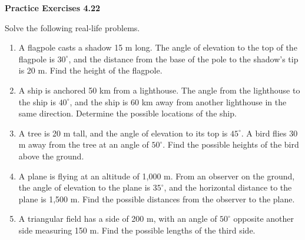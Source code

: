 \vspace{0.3ex}
\noindent\textbf{Practice Exercises 4.22}

\vspace{0.2ex}

Solve the following real-life problems.

\begin{enumerate}
    \item A flagpole casts a shadow 15 m long. The angle of elevation to the top of the flagpole is \(30^\circ\), and the distance from the base of the pole to the shadow's tip is 20 m. Find the height of the flagpole.
    \item A ship is anchored 50 km from a lighthouse. The angle from the lighthouse to the ship is \(40^\circ\), and the ship is 60 km away from another lighthouse in the same direction. Determine the possible locations of the ship.
    \item A tree is 20 m tall, and the angle of elevation to its top is \(45^\circ\). A bird flies 30 m away from the tree at an angle of \(50^\circ\). Find the possible heights of the bird above the ground.
    \item A plane is flying at an altitude of 1,000 m. From an observer on the ground, the angle of elevation to the plane is \(35^\circ\), and the horizontal distance to the plane is 1,500 m. Find the possible distances from the observer to the plane.
    \item A triangular field has a side of 200 m, with an angle of \(50^\circ\) opposite another side measuring 150 m. Find the possible lengths of the third side.
\end{enumerate}
